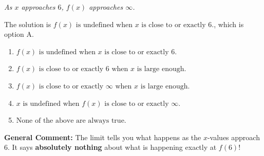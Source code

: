 \documentclass{extbook}[14pt]
\begin{document}
\begin{enumerate}
{\begin{center}
    \textit{ As $x$ approaches $6$, $f(x)$ approaches $\infty$. }
\end{center}
The solution is \( f(x) \text{ is undefined when } x \text{ is close to or exactly } 6. \), which is option A.\begin{enumerate}[label=\Alph*.]
\item \( f(x) \text{ is undefined when } x \text{ is close to or exactly } 6. \)


\item \( f(x) \text{ is close to or exactly } 6 \text{ when } x \text{ is large enough}. \)


\item \( f(x) \text{ is close to or exactly } \infty \text{ when } x \text{ is large enough}. \)


\item \( x \text{ is undefined when } f(x) \text{ is close to or exactly } \infty. \)


\item \( \text{None of the above are always true.} \)


\end{enumerate}

\textbf{General Comment:} The limit tells you what happens as the $x$-values approach $6$. It says \textbf{absolutely nothing} about what is happening exactly at $f(6)$!
}
\end{enumerate}
\end{document}
